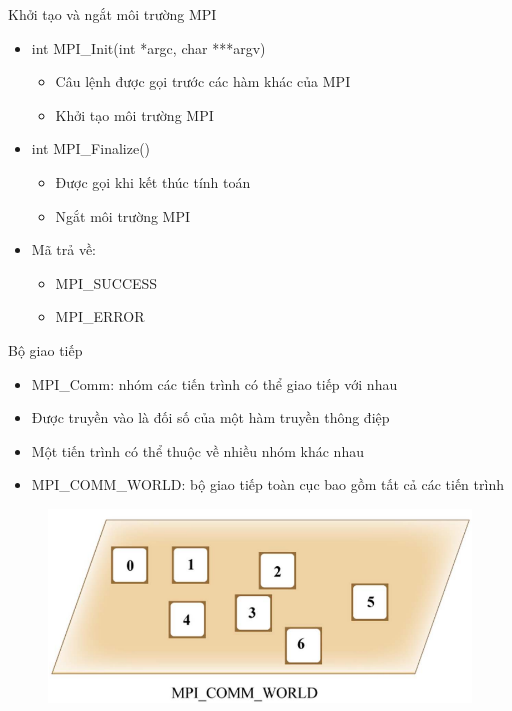 \documentclass[10pt]{beamer}
\theoremstyle{remark}
\numberwithin{algocf}{section}
\numberwithin{equation}{section}
\numberwithin{dl}{section}
\numberwithin{figure}{section}
\begin{document}
\begin{frame}{Khởi tạo và ngắt môi trường MPI}
    \begin{itemize}
        \item int MPI\_Init(int *argc, char ***argv) 
        \begin{itemize}
            \item Câu lệnh được gọi trước các hàm khác của MPI
            \item Khởi tạo môi trường MPI
        \end{itemize}
        \item int MPI\_Finalize()
        \begin{itemize}
            \item Được gọi khi kết thúc tính toán
            \item Ngắt môi trường MPI
        \end{itemize}
        \item Mã trả về:
        \begin{itemize}
            \item MPI\_SUCCESS
            \item MPI\_ERROR
        \end{itemize}
    \end{itemize}
\end{frame}

\begin{frame}{Bộ giao tiếp}
    \begin{itemize}
        \item MPI\_Comm: nhóm các tiến trình có thể giao tiếp với nhau
        \item Được truyền vào là đối số của một hàm truyền thông điệp
        \item Một tiến trình có thể thuộc về nhiều nhóm khác nhau
        \item MPI\_COMM\_WORLD: bộ giao tiếp toàn cục bao gồm tất cả các tiến trình
    \end{itemize}
    \begin{figure}[H]
        \centering
        \includegraphics[height=0.4\textheight]{figures/MPI/MPI_COMM_WORLD.png}
    \end{figure}
\end{frame}
\end{document}
